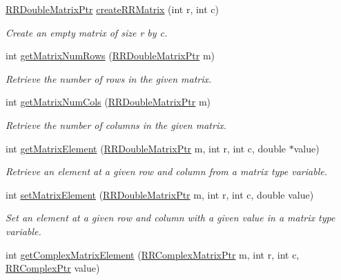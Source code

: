 \begin{DoxyCompactItemize}
\hyperlink{rrc__types_8h_ae586a879d30f0823087e42d93464b5dd}{R\+R\+Double\+Matrix\+Ptr} \hyperlink{group__helper_routines_gaf462e87fffe618001f9a090db897b014}{create\+R\+R\+Matrix} (int r, int c)
\begin{DoxyCompactList}\small\item\em Create an empty matrix of size r by c. \end{DoxyCompactList}\item 
int \hyperlink{group__helper_routines_gace79da82f227142b2b12203eb90b39c2}{get\+Matrix\+Num\+Rows} (\hyperlink{rrc__types_8h_ae586a879d30f0823087e42d93464b5dd}{R\+R\+Double\+Matrix\+Ptr} m)
\begin{DoxyCompactList}\small\item\em Retrieve the number of rows in the given matrix. \end{DoxyCompactList}\item 
int \hyperlink{group__helper_routines_ga48c14f12ed0903649369318daa595c16}{get\+Matrix\+Num\+Cols} (\hyperlink{rrc__types_8h_ae586a879d30f0823087e42d93464b5dd}{R\+R\+Double\+Matrix\+Ptr} m)
\begin{DoxyCompactList}\small\item\em Retrieve the number of columns in the given matrix. \end{DoxyCompactList}\item 
int \hyperlink{group__helper_routines_gae1b9fc81b2c9379ec766f3a14a103a99}{get\+Matrix\+Element} (\hyperlink{rrc__types_8h_ae586a879d30f0823087e42d93464b5dd}{R\+R\+Double\+Matrix\+Ptr} m, int r, int c, double $\ast$value)
\begin{DoxyCompactList}\small\item\em Retrieve an element at a given row and column from a matrix type variable. \end{DoxyCompactList}\item 
int \hyperlink{group__helper_routines_gaac229ffb487bdf1659e5d8a19493cd8a}{set\+Matrix\+Element} (\hyperlink{rrc__types_8h_ae586a879d30f0823087e42d93464b5dd}{R\+R\+Double\+Matrix\+Ptr} m, int r, int c, double value)
\begin{DoxyCompactList}\small\item\em Set an element at a given row and column with a given value in a matrix type variable. \end{DoxyCompactList}\item 
int \hyperlink{group__helper_routines_ga1c104936ccbc2cd87925c9baae981133}{get\+Complex\+Matrix\+Element} (\hyperlink{rrc__types_8h_a8cf9e865d8541d100f153800adbb7c3f}{R\+R\+Complex\+Matrix\+Ptr} m, int r, int c, \hyperlink{rrc__types_8h_ada2046d7326c56ae29d8510fbf6622ee}{R\+R\+Complex\+Ptr} value)

\end{DoxyCompactItemize}
